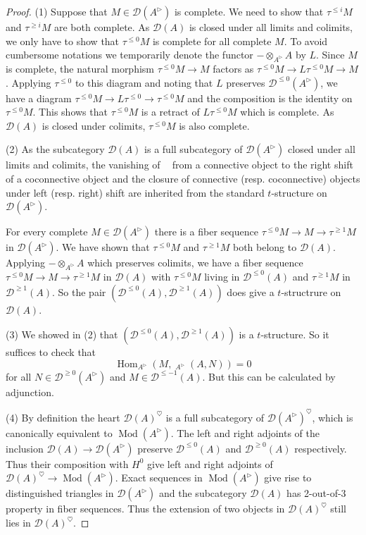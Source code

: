 \documentclass{article}
\theoremstyle{plain}
\theoremstyle{definition}
\theoremstyle{remark}
\DeclareMathOperator{\Hom}{Hom}
\DeclareMathOperator{\Homs}{\underline{Hom}}
\DeclareMathOperator{\rhoms}{\underline{RHom}}
\DeclareMathOperator{\modcat}{Mod}
\newcommand{\huflag}{\triangleright}
\newcommand{\D}{\mathcal{D}}
\newcommand{\heart}{\heartsuit}
\begin{document}
\begin{proof}
(1)
Suppose that $ M \in \D (A ^{\huflag}) $ is complete. We need to show that $ \tau ^{\leq i} M $ and $ \tau ^{\geq i}M $ are both complete.
As $ \D (A) $ is closed under all limits and colimits, we only have to show that $ \tau ^{\leq 0}M $ is complete for all complete $ M $.
To avoid cumbersome notations we temporarily denote the functor $ -\otimes _{A ^{\huflag}} A $ by $ L $.
Since $ M $ is complete, the natural morphism $ \tau ^{\leq 0}M\to M $ factors as $ \tau ^{\leq 0}M\to L \tau ^{\leq 0}M\to M $.
Applying $ \tau ^{\leq 0} $ to this diagram and noting that $ L $ preserves $ \D ^{\leq 0} (A ^{\huflag}) $,
we have a diagram $ \tau ^{\leq 0}M\to L \tau ^{\leq 0}\to \tau ^{\leq 0}M $ and the composition is the identity on $ \tau ^{\leq 0} M $.
This shows that $ \tau ^{\leq 0}M $ is a retract of $ L \tau ^{\leq 0}M $ which is complete.
As $ \D (A) $ is closed under colimits, $ \tau ^{\leq 0}M $ is also complete.

(2)
As the subcategory $ \D (A) $ is a full subcategory of $ \D (A ^{\huflag}) $ closed under all limits and colimits,
the vanishing of $ \rhoms $ from a connective object to the right shift of a coconnective object
and the closure of connective (resp. coconnective) objects under left (resp. right) shift
are inherited from the standard $ t $-structure on $ \D (A ^{\huflag}) $.

For every complete $ M\in \D (A ^{\huflag}) $ there is a fiber sequence
$ \tau ^{\leq 0}M\to M\to \tau ^{\geq 1}M $ in $ \D (A ^{\huflag}) $.
We have shown that $ \tau ^{\leq 0}M $ and $ \tau ^{\geq 1}M $ both belong to $ \D (A) $.
Applying $ -\otimes _{A ^{\huflag}} A $ which preserves colimits, we have a fiber sequence
$ \tau ^{\leq 0}M\to M\to \tau ^{\geq 1}M $ in $ \D (A) $
with $ \tau ^{\leq 0}M $ living in $ \D ^{\leq 0}(A) $ and $ \tau ^{\geq 1}M $ in $ \D ^{\geq 1}(A) $.
So the pair $ (\D ^{\leq 0}(A), \D ^{\geq 1}(A)) $ does give a $ t $-structrure on $ \D (A) $.

(3)
We showed in (2) that $ (\D ^{\leq 0}(A), \D ^{\geq 1}(A)) $ is a $ t $-structure.
So it suffices to check that $$ \Hom _{A ^{\huflag}}(M, \Homs _{A ^{\huflag}}(A, N)) = 0 $$
for all $ N\in \D ^{\geq 0}(A ^{\huflag}) $ and $ M\in \D ^{\leq -1}(A) $.
But this can be calculated by adjunction.

(4)
By definition the heart $ \D (A)^{\heart} $ is a full subcategory of $ \D (A ^{\huflag})^{\heart} $, which is canonically equivalent to 
$ \modcat (A ^{\huflag}) $.
The left and right adjoints of the inclusion $ \D (A)\to \D (A ^{\huflag}) $
preserve $ \D ^{\leq 0}(A) $ and $ \D ^{\geq 0}(A) $ respectively.
Thus their composition with $ H ^{0} $ give left and right adjoints of $ \D (A)^{\heart}\to \modcat (A ^{\huflag}) $.
Exact sequences in $ \modcat (A ^{\huflag}) $ give rise to distinguished triangles in $ \D (A ^{\huflag}) $ and
the subcategory $ \D (A) $ has 2-out-of-3 property in fiber sequences. Thus the extension of two objects in $ \D (A) ^{\heart} $
still lies in $ \D (A) ^{\heart} $.


\end{proof}
\end{document}
